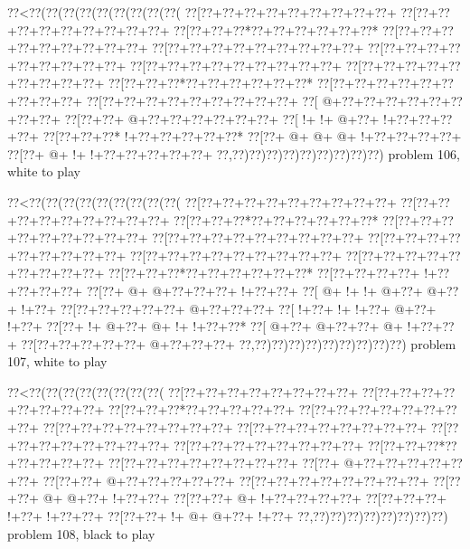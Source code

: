 \vbox{\vbox{\goo
\0??<\0??(\0??(\0??(\0??(\0??(\0??(\0??(\0??(\0??(
\0??[\0??+\0??+\0??+\0??+\0??+\0??+\0??+\0??+\0??+
\0??[\0??+\0??+\0??+\0??+\0??+\0??+\0??+\0??+\0??+
\0??[\0??+\0??+\0??*\0??+\0??+\0??+\0??+\0??+\0??*
\0??[\0??+\0??+\0??+\0??+\0??+\0??+\0??+\0??+\0??+
\0??[\0??+\0??+\0??+\0??+\0??+\0??+\0??+\0??+\0??+
\0??[\0??+\0??+\0??+\0??+\0??+\0??+\0??+\0??+\0??+
\0??[\0??+\0??+\0??+\0??+\0??+\0??+\0??+\0??+\0??+
\0??[\0??+\0??+\0??+\0??+\0??+\0??+\0??+\0??+\0??+
\0??[\0??+\0??+\0??*\0??+\0??+\0??+\0??+\0??+\0??*
\0??[\0??+\0??+\0??+\0??+\0??+\0??+\0??+\0??+\0??+
\0??[\0??+\0??+\0??+\0??+\0??+\0??+\0??+\0??+\0??+
\0??[\- @+\0??+\0??+\0??+\0??+\0??+\0??+\0??+\0??+
\0??[\0??+\0??+\- @+\0??+\0??+\0??+\0??+\0??+\0??+
\0??[\- !+\- !+\- @+\0??+\- !+\0??+\0??+\0??+\0??+
\0??[\0??+\0??+\0??*\- !+\0??+\0??+\0??+\0??+\0??*
\0??[\0??+\- @+\- @+\- @+\- !+\0??+\0??+\0??+\0??+
\0??[\0??+\- @+\- !+\- !+\0??+\0??+\0??+\0??+\0??+
\0??,\0??)\0??)\0??)\0??)\0??)\0??)\0??)\0??)\0??)
}
\hfil problem 106, white to play\hfil\break
}

\vbox{\vbox{\goo
\0??<\0??(\0??(\0??(\0??(\0??(\0??(\0??(\0??(\0??(
\0??[\0??+\0??+\0??+\0??+\0??+\0??+\0??+\0??+\0??+
\0??[\0??+\0??+\0??+\0??+\0??+\0??+\0??+\0??+\0??+
\0??[\0??+\0??+\0??*\0??+\0??+\0??+\0??+\0??+\0??*
\0??[\0??+\0??+\0??+\0??+\0??+\0??+\0??+\0??+\0??+
\0??[\0??+\0??+\0??+\0??+\0??+\0??+\0??+\0??+\0??+
\0??[\0??+\0??+\0??+\0??+\0??+\0??+\0??+\0??+\0??+
\0??[\0??+\0??+\0??+\0??+\0??+\0??+\0??+\0??+\0??+
\0??[\0??+\0??+\0??+\0??+\0??+\0??+\0??+\0??+\0??+
\0??[\0??+\0??+\0??*\0??+\0??+\0??+\0??+\0??+\0??*
\0??[\0??+\0??+\0??+\0??+\- !+\0??+\0??+\0??+\0??+
\0??[\0??+\- @+\- @+\0??+\0??+\0??+\- !+\0??+\0??+
\0??[\- @+\- !+\- !+\- @+\0??+\- @+\0??+\- !+\0??+
\0??[\0??+\0??+\0??+\0??+\0??+\- @+\0??+\0??+\0??+
\0??[\- !+\0??+\- !+\- !+\0??+\- @+\0??+\- !+\0??+
\0??[\0??+\- !+\- @+\0??+\- @+\- !+\- !+\0??+\0??*
\0??[\- @+\0??+\- @+\0??+\0??+\- @+\- !+\0??+\0??+
\0??[\0??+\0??+\0??+\0??+\0??+\- @+\0??+\0??+\0??+
\0??,\0??)\0??)\0??)\0??)\0??)\0??)\0??)\0??)\0??)
}
\hfil problem 107, white to play\hfil\break
}

\vbox{\vbox{\goo
\0??<\0??(\0??(\0??(\0??(\0??(\0??(\0??(\0??(
\0??[\0??+\0??+\0??+\0??+\0??+\0??+\0??+\0??+
\0??[\0??+\0??+\0??+\0??+\0??+\0??+\0??+\0??+
\0??[\0??+\0??+\0??*\0??+\0??+\0??+\0??+\0??+
\0??[\0??+\0??+\0??+\0??+\0??+\0??+\0??+\0??+
\0??[\0??+\0??+\0??+\0??+\0??+\0??+\0??+\0??+
\0??[\0??+\0??+\0??+\0??+\0??+\0??+\0??+\0??+
\0??[\0??+\0??+\0??+\0??+\0??+\0??+\0??+\0??+
\0??[\0??+\0??+\0??+\0??+\0??+\0??+\0??+\0??+
\0??[\0??+\0??+\0??*\0??+\0??+\0??+\0??+\0??+
\0??[\0??+\0??+\0??+\0??+\0??+\0??+\0??+\0??+
\0??[\0??+\- @+\0??+\0??+\0??+\0??+\0??+\0??+
\0??[\0??+\0??+\- @+\0??+\0??+\0??+\0??+\0??+
\0??[\0??+\0??+\0??+\0??+\0??+\0??+\0??+\0??+
\0??[\0??+\0??+\- @+\- @+\0??+\- !+\0??+\0??+
\0??[\0??+\0??+\- @+\- !+\0??+\0??+\0??+\0??+
\0??[\0??+\0??+\0??+\- !+\0??+\- !+\0??+\0??+
\0??[\0??+\0??+\- !+\- @+\- @+\0??+\- !+\0??+
\0??,\0??)\0??)\0??)\0??)\0??)\0??)\0??)\0??)
}
\hfil problem 108, black to play\hfil\break
}


